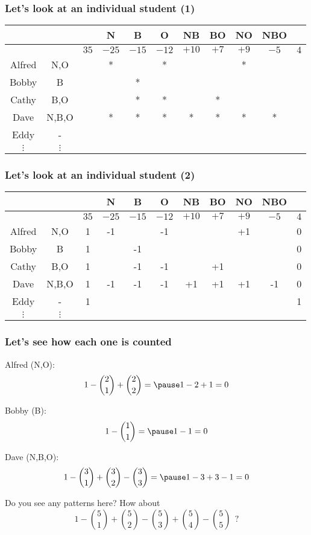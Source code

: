 \begin{frame}\frametitle{Let's look at an individual student (1)}
  {\small
  \begin{tabular}{c|c||c|c|c|c|c|c|c|c||c}
    & &  & N & B & O & NB & BO & NO & NBO & \\
    \hline
    & & $35$ & $-25$ & $-15$ & $-12$ & $+10$ & $+7$ & $+9$ & $-5$ & $4$ \\
    \hline
    Alfred & N,O & \pause * & * & & * & & & * & & \\
    Bobby & B & \pause * & & * & & & & & & \\
    Cathy & B,O & \pause * & & * & * & & * & & & \\
    Dave & N,B,O & \pause * & * & * & * & * & * & * & * & \\
    Eddy & - & \pause * & &  & & & & & & \\
    $\vdots$ & $\vdots$ & & & & & & & & & \\
  \end{tabular}
  }
\end{frame}

\begin{frame}\frametitle{Let's look at an individual student (2)}
  {\small
  \begin{tabular}{c|c||c|c|c|c|c|c|c|c||c}
    & &  & N & B & O & NB & BO & NO & NBO & \\
    \hline
    & & $35$ & $-25$ & $-15$ & $-12$ & $+10$ & $+7$ & $+9$ & $-5$ & $4$ \\
    \hline
    Alfred & N,O & 1 & -1 & & -1 & & & +1 & & 0 \\
    Bobby & B & 1 & & -1 & & & & & & 0 \\
    Cathy & B,O & 1 & & -1 & -1 & & +1 & & & 0 \\
    Dave & N,B,O & 1 & -1 & -1 & -1 & +1 & +1 & +1 & -1 & 0 \\
    Eddy & - & 1 & &  & & & & & & 1 \\
    $\vdots$ & $\vdots$ & & & & & & & & & \\
  \end{tabular}
  }
\end{frame}

\begin{frame}\frametitle{Let's see how each one is counted}
  Alfred (N,O): \pause $$1 - {2\choose 1} + {2\choose 2} = \pause 1 - 2 + 1 = 0$$

  Bobby (B): \pause $$1 - {1\choose 1} = \pause 1 - 1 = 0$$

  Dave (N,B,O): \pause $$1 - {3\choose 1} + {3\choose 2} - {3\choose 3} = \pause 1 - 3 + 3 - 1 = 0$$

  \pause

  Do you see any patterns here?
  \pause
  How about $$1 - {5\choose 1} + {5\choose 2} - {5\choose 3} + {5\choose 4} - {5\choose 5}\ \ ?$$
\end{frame}

